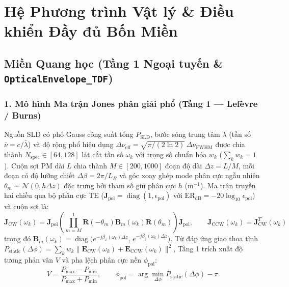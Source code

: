 \documentclass[11pt, a4paper]{article}
\begin{document}
\section{Hệ Phương trình Vật lý \& Điều khiển Đầy đủ Bốn Miền}

\subsection{Miền Quang học (Tầng 1 Ngoại tuyến \& \texttt{OpticalEnvelope\_TDF})}

\subsubsection*{1. Mô hình Ma trận Jones phân giải phổ (Tầng 1 --- Lefèvre / Burns)}
Nguồn SLD có phổ Gauss công suất tổng $P_{\text{SLD}}$, bước sóng trung tâm $\bar{\lambda}$ (tần số $\bar{\nu} = c/\bar{\lambda}$) và độ rộng phổ hiệu dụng $\Delta\nu_{\text{eff}} = \sqrt{\pi/(2\ln 2)}\,\Delta\nu_{\text{FWHM}}$ được chia thành $N_{\text{spec}} \in [64, 128]$ lát cắt tần số $\omega_k$ với trọng số chuẩn hóa $w_k$ ($\sum_k w_k = 1$). Cuộn sợi PM dài $L$ chia thành $M \in [200, 1000]$ đoạn độ dài $\Delta z = L/M$, mỗi đoạn có độ lưỡng chiết $\Delta\beta = 2\pi / L_B$ và góc xoay ghép mode phân cực ngẫu nhiên $\theta_m \sim \mathcal{N}(0, h\Delta z)$ đặc trưng bởi tham số giữ phân cực $h$ ($\text{m}^{-1}$). Ma trận truyền hai chiều qua bộ phân cực TE ($\mathbf{J}_{\text{pol}} = \operatorname{diag}(1, \epsilon_{\text{pol}})$ với $\mathrm{ER}_{\text{dB}} = -20\log_{10}\epsilon_{\text{pol}}$) và cuộn sợi là:
\begin{equation}
\mathbf{J}_{\text{CW}}(\omega_k) = \mathbf{J}_{\text{pol}} \left(\prod_{m=M}^{1} \mathbf{R}(-\theta_m)\mathbf{B}_m(\omega_k)\mathbf{R}(\theta_m)\right) \mathbf{J}_{\text{pol}}, \qquad
\mathbf{J}_{\text{CCW}}(\omega_k) = \mathbf{J}_{\text{CW}}^{T}(\omega_k)
\end{equation}
trong đó $\mathbf{B}_m(\omega_k) = \operatorname{diag}\!\bigl(e^{-j\beta_x(\omega_k)\Delta z},\, e^{-j\beta_y(\omega_k)\Delta z}\bigr)$. Từ đáp ứng giao thoa tĩnh $P_{\text{static}}(\Delta\phi) = \sum_k w_k \|\mathbf{E}_{\text{CW}}(\omega_k) + \mathbf{E}_{\text{CCW}}(\omega_k)\|^2$, Tầng 1 trích xuất độ tương phản vân $V$ và pha lệch phân cực nền $\phi_{\text{pol}}$:
\begin{equation}
V = \frac{P_{\max} - P_{\min}}{P_{\max} + P_{\min}}, \qquad
\phi_{\text{pol}} = \arg\min_{\Delta\phi} P_{\text{static}}(\Delta\phi) - \pi
\end{equation}
\end{document}
